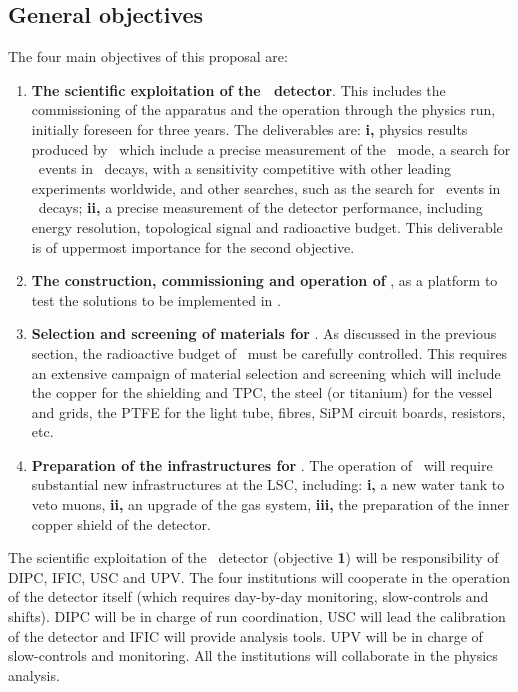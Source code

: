 
\subsection*{General objectives}

The four main objectives of this proposal are:
\begin{enumerate}
\item {\bf The scientific exploitation of the \Next\ detector}. This includes the commissioning of the apparatus and the operation through the physics run, initially foreseen for three years. The deliverables are: {\bf i,} physics results produced by \Next\ which include a precise measurement of the \bbtnu\ mode, a search for \bbonu\ events in \XE\ decays, with a sensitivity competitive with other leading experiments worldwide, and other searches, such as the search for \bbonu\ events in \XEX\ decays; {\bf ii,} a precise measurement of the detector performance, including energy resolution, topological signal and radioactive budget. This deliverable is of uppermost importance for the second objective. 
\item {\bf The construction, commissioning and operation of \HDEMO}, as a platform to test the solutions to be implemented in \NHD.  
\item {\bf Selection and screening of materials for \NHD}. As discussed in the previous section, the radioactive budget of \NHD\ must be carefully controlled. This requires an extensive campaign of material selection and screening which will include the copper for the shielding and TPC, the steel (or titanium) for the vessel and grids, the PTFE for the light tube, fibres, SiPM circuit boards, resistors, etc. 
\item {\bf Preparation of the infrastructures for \NHD}. The operation of \NHD\ will require substantial new infrastructures at the LSC, including: {\bf i,} a new water tank to veto muons, {\bf ii,} an upgrade of the gas system, {\bf iii,} the preparation of the inner copper shield of the detector. 
\end{enumerate}

\indent

The scientific exploitation of the \Next\ detector (objective {\bf 1}) will be responsibility of DIPC, IFIC,  USC and UPV. The four institutions will cooperate in the operation of the detector itself (which requires day-by-day monitoring, slow-controls and shifts). DIPC will be in charge of run coordination, USC will lead the calibration of the detector and IFIC will provide analysis tools. UPV will be in charge of slow-controls and monitoring. All the institutions will collaborate in the physics analysis.  

